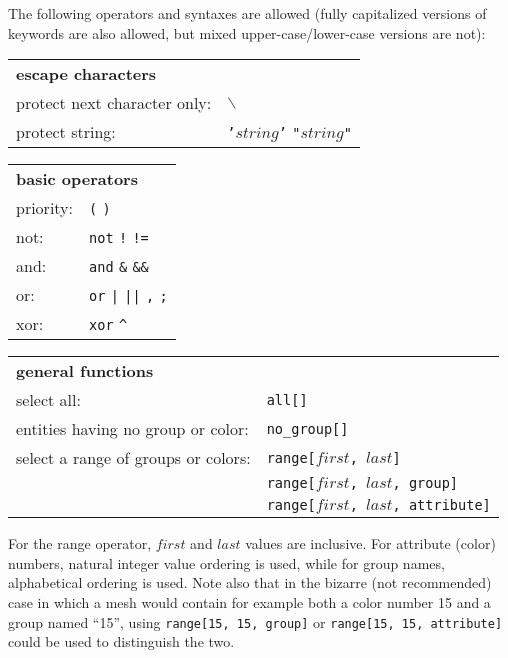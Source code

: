 {{{{The following operators and syntaxes are allowed (fully capitalized
versions of keywords are also allowed, but mixed upper-case/lower-case
versions are not):

\begin{tabular}[top]{p{6cm} l}
\multicolumn{2}{l}{\bf escape characters }\\
protect next character only: & \texttt{$\backslash$} \\
protect string:              & \texttt{{'}$string${'}} \quad \texttt{"$string$"}\\
\end{tabular}

\begin{tabular}[top]{p{6cm} l}
\multicolumn{2}{l}{\bf basic operators }\\
priority: & \texttt{(} \quad \texttt{)} \\
not:      &  \texttt{not} \quad \texttt{!} \quad \texttt{!=} \\
and:      &  \texttt{and} \quad \texttt{\&} \quad \texttt{\&\&} \\
or:       &  \texttt{or} \quad \texttt{|} \quad \texttt{||} \quad \texttt{,} \quad \texttt{;} \\
xor:      &  \texttt{xor} \quad \texttt{\^} \\
\end{tabular}

\begin{tabular}[top]{p{6cm} l}
\multicolumn{2}{l}{\bf general functions }\\
select all:                        &  \texttt{all[]}\\
entities having no group or color: &  \texttt{no\_group[]} \\
select a range of groups or colors: &  \texttt{range[$first$, $last$]} \\
                                    &  \texttt{range[$first$, $last$, group]} \\
                                    &  \texttt{range[$first$, $last$, attribute]} \\
\end{tabular}

For the range operator, $first$ and $last$ values are inclusive.
For attribute (color) numbers, natural integer value ordering is used,
while for group names, alphabetical ordering is used. Note also that in
the bizarre (not recommended) case in which a mesh would contain for
example both a color number 15 and a group named ``15'', using
\texttt{range[15, 15, group]} or \texttt{range[15, 15, attribute]}
could be used to distinguish the two.

}}}}
